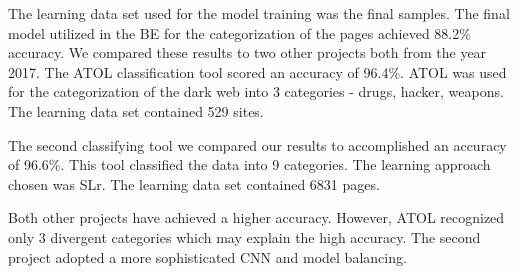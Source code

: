 The learning data set used for the model training was the final samples. The final model utilized in the BE for the categorization of the pages achieved 88.2\% accuracy. We compared these results to two other projects both from the year 2017. The ATOL \cite{atol} classification tool scored an accuracy of 96.4\%. ATOL was used for the categorization of the dark web into 3 categories - drugs, hacker, weapons. The learning data set contained 529 sites. 

The second classifying tool \cite{classificationProject} we compared our results to accomplished an accuracy of 96.6\%. This tool classified the data into 9 categories. The learning approach chosen was SLr. The learning data set contained 6831 pages. 

Both other projects have achieved a higher accuracy. However, ATOL recognized only 3 divergent categories which may explain the high accuracy. The second project adopted a more sophisticated CNN and model balancing. 

